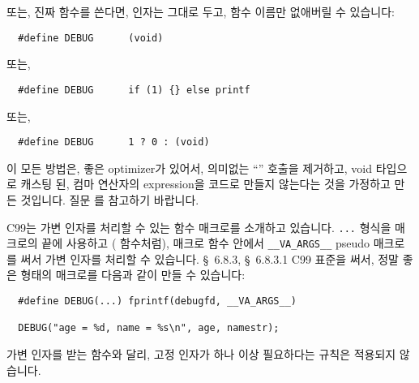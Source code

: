 \begin{faq}
	\noindent 또는, 진짜 함수를 쓴다면, 인자는 그대로 두고, 함수 이름만
        없애버릴 수 있습니다:
\begin{verbatim}
  #define DEBUG      (void)
\end{verbatim}
	\noindent 또는,
\begin{verbatim}
  #define DEBUG      if (1) {} else printf
\end{verbatim}
	\noindent 또는,
\begin{verbatim}
  #define DEBUG      1 ? 0 : (void)
\end{verbatim}
	\noindent 이 모든 방법은, 좋은 optimizer가 있어서, 의미없는
        ``'' 호출을 제거하고, void 타입으로 캐스팅 된, 컴마 연산자의
        expression을 코드로 만들지 않는다는 것을 가정하고 만든 것입니다.
        질문 를 참고하기 바랍니다.

	C99는 가변 인자를 처리할 수 있는 함수 매크로를 소개하고 있습니다.
	\verb+...+ 형식을 매크로의 끝에 사용하고 ( 함수처럼),
	매크로 함수 안에서 \verb+__VA_ARGS__+ pseudo 매크로를 써서 가변 인자를
	처리할 수 있습니다.
\R
	\cite{c89} \S\ 6.8.3, \S\ 6.8.3.1
\T
	C99 표준을 써서, 정말 좋은 형태의  매크로를 다음과 같이
        만들 수 있습니다:
\begin{verbatim}
  #define DEBUG(...) fprintf(debugfd, __VA_ARGS__)

  DEBUG("age = %d, name = %s\n", age, namestr);
\end{verbatim}
	\noindent 가변 인자를 받는 함수와 달리, 고정 인자가 하나 이상
        필요하다는 규칙은 적용되지 않습니다. 
\R

\end{faq}

